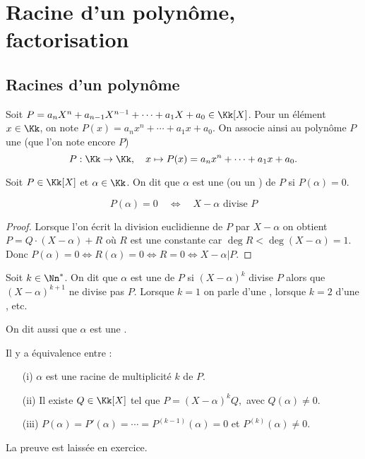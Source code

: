 \documentclass[class=report,crop=false]{standalone}
\begin{document}
\section{Racine d'un polynôme, factorisation}

\subsection{Racines d'un polynôme}

\begin{definition}
Soit $P=a_nX^n+a_{n-1}X^{n-1}+\cdots+a_1X+a_0\in\Kk[X]$.
Pour un élément $x \in \Kk$, on note $P(x)=a_nx^n+\cdots+a_1x+ a_0$.
On associe ainsi au polynôme $P$ une 
(que l'on note encore $P$)
$$P: \Kk\to \Kk, \quad x \mapsto P(x)=a_nx^n+\cdots+a_1x+ a_0.$$
\end{definition}



\begin{definition}
Soit $P\in\Kk[X]$ et $\alpha\in\Kk$. On dit que
$\alpha$ est une  (ou un ) de $P$ si $P(\alpha)=0$.
\end{definition}

\begin{proposition}
$$P(\alpha)=0 \quad \iff \quad X-\alpha \text{ divise } P$$
\end{proposition}

\begin{proof}
Lorsque l'on écrit la division euclidienne de $P$ par $X-\alpha$ on obtient
$P=Q\cdot(X-\alpha)+R$ où $R$ est une constante car $\deg R < \deg (X-\alpha) =1$.
Donc $P(\alpha)=0 \iff R(\alpha) =0 \iff R=0 \iff X-\alpha | P$.
\end{proof}

\begin{definition}
  Soit $k\in \Nn^*$. On dit que $\alpha$ est une 
 de $P$ si $(X-\alpha )^k$ divise $P$ alors que $(X- \alpha )^{k+1}$ ne divise pas $P$.
Lorsque $k=1$ on parle d'une , lorsque $k=2$ d'une , etc.
\end{definition}

On dit aussi que $\alpha$ est une .

\begin{proposition}
\label{prop:racmul}
Il y a équivalence entre :
\begin{itemize}
  \item[(i)] $\alpha$ est une racine de multiplicité $k$ de $P$.

  \item[(ii)] Il existe  $Q \in\Kk[X]$ tel que $P=(X-\alpha)^kQ,$ avec $Q(\alpha) \neq 0$.

  \item[(iii)] $P(\alpha)= P'(\alpha)=\cdots=P^{(k-1)}(\alpha)=0$ et $P^{(k)}(\alpha) \neq 0$.
\end{itemize}
\end{proposition}
La preuve est laissée en exercice.
\end{document}
